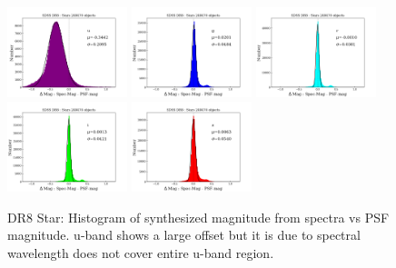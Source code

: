 \documentclass[apj,twocolumn]{aastex631}
\begin{document}
\begin{figure}%
\begin{center}
\includegraphics[angle=0,width=3.5cm]{figures/20220811_dmag_histogram_u_dr8stars.png}
\includegraphics[angle=0,width=3.5cm]{figures/20220811_dmag_histogram_g_dr8stars.png}
\includegraphics[angle=0,width=3.5cm]{figures/20220811_dmag_histogram_r_dr8stars.png}
\includegraphics[angle=0,width=3.5cm]{figures/20220811_dmag_histogram_i_dr8stars.png}
\includegraphics[angle=0,width=3.5cm]{figures/20220811_dmag_histogram_z_dr8stars.png}
\caption{DR8 Star: Histogram of synthesized magnitude from spectra vs PSF magnitude.
u-band shows a large offset but it is due to spectral wavelength does not cover entire u-band region.}
\end{center}
\end{figure}
\end{document}

